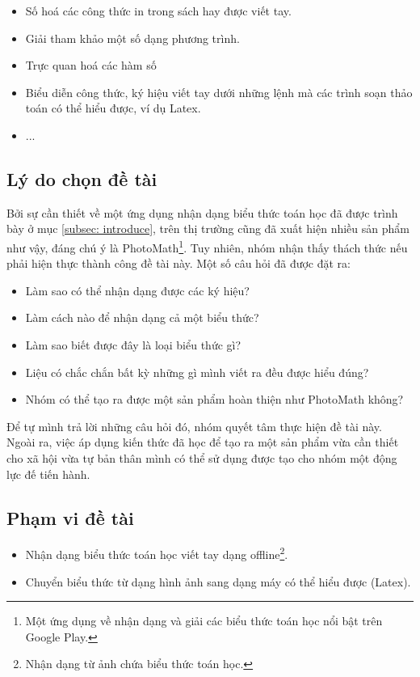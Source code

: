 \documentclass[a4paper]{article}
\theoremstyle{definition}
\begin{document}
	\begin{itemize}
		\item Số hoá các công thức in trong sách hay được viết tay.
		\item Giải tham khảo một số dạng phương trình.
		\item Trực quan hoá các hàm số
		\item Biểu diễn công thức, ký hiệu viết tay dưới những lệnh mà các trình soạn thảo toán có thể hiểu được, ví dụ Latex.
		\item ...
		
	\end{itemize}
	
	
	
	\subsection{Lý do chọn đề tài}
	Bởi sự cần thiết về một ứng dụng nhận dạng biểu thức toán học đã được trình bày ở mục \ref{subsec: introduce}, trên thị trường cũng đã xuất hiện nhiều sản phẩm như vậy, đáng chú ý là PhotoMath\footnote{Một ứng dụng về nhận dạng và giải các biểu thức toán học nổi bật trên Google Play.}. Tuy nhiên, nhóm nhận thấy thách thức nếu phải hiện thực thành công đề tài này. Một số câu hỏi đã được đặt ra:\\
	\begin{itemize}
		\item Làm sao có thể nhận dạng được các ký hiệu?
		\item Làm cách nào để nhận dạng cả một biểu thức?
		\item Làm sao biết được đây là loại biểu thức gì?
		\item Liệu có chắc chắn bất kỳ những gì mình viết ra đều được hiểu đúng? 
		\item Nhóm có thể tạo ra được một sản phẩm hoàn thiện như PhotoMath không?
		
	\end{itemize}
	
	Để tự mình trả lời những câu hỏi đó, nhóm quyết tâm thực hiện đề tài này. Ngoài ra, việc áp dụng kiến thức đã học để tạo ra một sản phẩm vừa cần thiết cho xã hội vừa tự bản thân mình có thể sử dụng được tạo cho nhóm một động lực đế tiến hành. 
	
	\subsection{Phạm vi đề tài}
	
	\begin{itemize}
		\item Nhận dạng biểu thức toán học viết tay dạng offline\footnote{Nhận dạng từ ảnh chứa biểu thức toán học.}.
		\item Chuyển biểu thức từ dạng hình ảnh sang dạng máy có thể hiểu được (Latex).
		
	\end{itemize}
	
\end{document}
